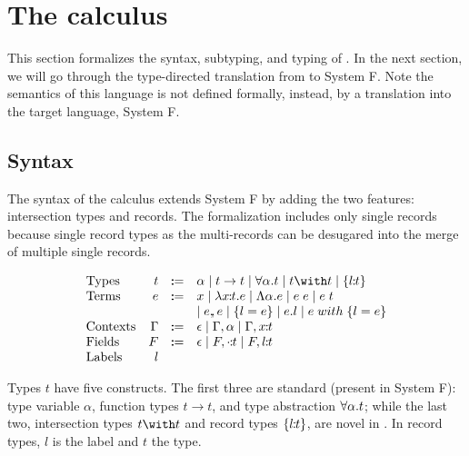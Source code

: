 \section{The \name calculus}

This section formalizes the syntax, subtyping, and typing of \name. In the next
section, we will go through the type-directed translation from \name to System
F. Note the semantics of this language is not defined formally, instead, by a
translation into the target language, System F.

\subsection{Syntax}

The syntax of the \name calculus extends System F by adding the two features:
intersection types and records. The formalization includes only single records
because single record types as the multi-records can be desugared into the merge
of multiple single records.

\[ \begin{array}{lrrl}
  \text{Types} & t & \dcoloneq &
    \alpha
    \mid t \to t
    \mid \univquant{\alpha}{t}
    \mid t \with t
    \mid \recordtype{l}{t} \\

  \text{Terms} & e & \dcoloneq &
    x
    \mid \abs{\rel{x}{t}}{e}
    \mid \Abs{\alpha}{e}
    \mid \app{e}{e}
    \mid \app{e}{t} \\ & & &
    \mid e \dcomma e
    \mid \recordintro{l}{e}
    \mid e.l
    \mid \recordupdate{e}{l}{e} \\

  \text{Contexts} & \Gamma & \dcoloneq &
    \epsilon
    \mid \Gamma, \alpha
    \mid \Gamma, \rel{x}{t} \\

  \text{Fields} & F & \dcoloneq &
    \epsilon
    \mid F, \rel{\cdot}{t}
    \mid F, \rel{l}{t} \\

  \text{Labels} & l &
\end{array} \]

Types $ t $ have five constructs. The first three are standard (present in
System F): type variable $ \alpha $, function types $ t \to t $, and type
abstraction $ \forall \alpha. t $; while the last two, intersection types
$ t \with t $ and record types $ \{ l \!\!:\!\! t \} $, are novel in \Name. In
record types, $ l $ is the label and $ t $ the type.

